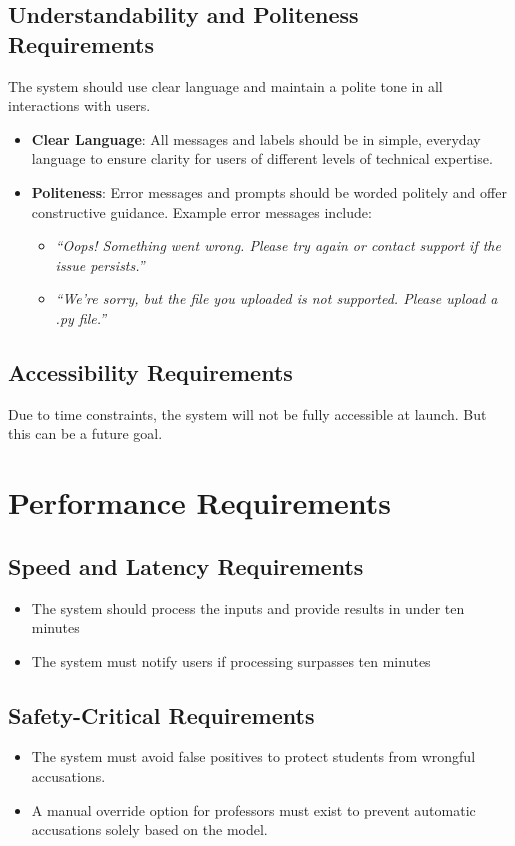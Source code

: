 \documentclass[12pt]{article}
\begin{document}
\subsection{Understandability and Politeness Requirements}
The system should use clear language and maintain a polite tone in all 
interactions with users.
\begin{itemize}
    \item \textbf{Clear Language}: All messages and labels should be in simple, 
    everyday language to ensure clarity for users of different levels of 
    technical expertise.
    
    \item \textbf{Politeness}: Error messages and prompts should be worded 
    politely and offer constructive guidance. Example error messages include:
    \begin{itemize}
        \item \textit{“Oops! Something went wrong. Please try again or contact 
        support if the issue persists.”}
        \item \textit{“We're sorry, but the file you uploaded is not supported. 
        Please upload a .py file.”}
    \end{itemize}
\end{itemize}

\subsection{Accessibility Requirements}
Due to time constraints, the system will not be fully accessible at launch. But this can be a future goal.

\section{Performance Requirements}
\subsection{Speed and Latency Requirements}
\begin{itemize}
    \item The system should process the inputs and provide results in under ten minutes 
    \item The system must notify users if processing surpasses ten minutes
\end{itemize}
\subsection{Safety-Critical Requirements}
\begin{itemize}
    \item The system must avoid false positives to protect students from wrongful accusations. 
    \item A manual override option for professors must exist to prevent automatic accusations solely based on the model.
\end{itemize}
\end{document}
